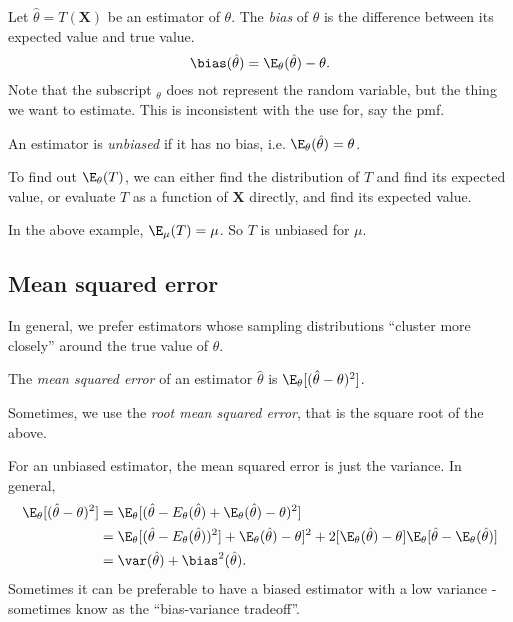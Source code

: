 \documentclass[a4paper]{article}
\begin{document}
\begin{defi}[Bias]
  Let $\hat{\theta} = T(\mathbf{X})$ be an estimator of $\theta$. The \emph{bias} of $\hat{\theta}$ is the difference between its expected value and true value.
  \[
    \bias(\hat{\theta}) = \E_\theta(\hat{\theta}) - \theta.
  \]
  Note that the subscript $_\theta$ does not represent the random variable, but the thing we want to estimate. This is inconsistent with the use for, say the pmf.

  An estimator is \emph{unbiased} if it has no bias, i.e. $\E_\theta(\hat{\theta}) = \theta$.
\end{defi}
To find out $\E_\theta (T)$, we can either find the distribution of $T$ and find its expected value, or evaluate $T$ as a function of $\mathbf{X}$ directly, and find its expected value. 

\begin{eg}
  In the above example, $\E_\mu(T) =\mu$. So $T$ is unbiased for $\mu$. 
\end{eg}
\subsection{Mean squared error}
In general, we prefer estimators whose sampling distributions ``cluster more closely'' around the true value of $\theta$.
\begin{defi}
  The \emph{mean squared error} of an estimator $\hat{\theta}$ is $\E_\theta[(\hat{\theta} - \theta)^2]$.

  Sometimes, we use the \emph{root mean squared error}, that is the square root of the above.
\end{defi}
For an unbiased estimator, the mean squared error is just the variance. In general,
\begin{align*}
  \E_\theta[(\hat{\theta} - \theta)^2] &= \E_\theta[(\hat{\theta} - E_\theta(\hat{\theta}) + \E_\theta(\hat{\theta}) - \theta)^2]\\
  &= \E_\theta[(\hat{\theta} - E_\theta(\hat{\theta}))^2] + \E_\theta(\hat{\theta}) - \theta]^2 + 2[\E_\theta(\hat{\theta}) - \theta]\E_\theta[\hat{\theta} - \E_\theta(\hat{\theta})]\\
  &= \var(\hat{\theta}) + \bias^2(\hat{\theta}).
\end{align*}
Sometimes it can be preferable to have a biased estimator with a low variance - sometimes know as the ``bias-variance tradeoff''.
\end{document}
